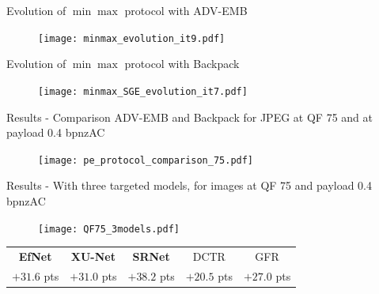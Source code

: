 \documentclass[10pt,aspectratio=169]{beamer}
\begin{document}



\begin{frame}{Evolution of $\min\max$ protocol with ADV-EMB}
    \begin{figure}
        \texttt{[image: minmax\_evolution\_it9.pdf]}
    \end{figure}
\end{frame}


\begin{frame}{Evolution of $\min\max$ protocol with Backpack}
    \begin{figure}
        \texttt{[image: minmax\_SGE\_evolution\_it7.pdf]}
    \end{figure}
\end{frame}



\begin{frame}{Results - Comparison ADV-EMB and Backpack for JPEG at QF 75 and at payload 0.4 bpnzAC}
    \begin{figure}[h]
        \texttt{[image: pe\_protocol\_comparison\_75.pdf]}
    \end{figure}
\end{frame}


\begin{frame}{Results - With three targeted models, for images at QF 75 and payload 0.4 bpnzAC}

    \begin{figure}[h]
        \texttt{[image: QF75\_3models.pdf]}
    \end{figure}
    \pause
    \begin{center}
        \begin{tabular}{ccccc}
           \textbf{EfNet} & \textbf{XU-Net} & \textbf{SRNet} & DCTR & GFR \\
           \alert{$+31.6 $ pts} & \alert{$+31.0$ pts} & \alert{$+38.2 $ pts} & $+20.5$ pts & $+27.0 $ pts
        \end{tabular}
    \end{center}
    
\end{frame}
\end{document}

